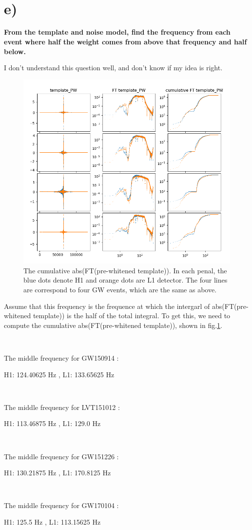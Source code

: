 \documentclass[showpacs, oneside, onecolumn, prl, amsmath, amssymb, nofootinbib, superscriptaddress, notitlepage]{revtex4-1}
\newcommand\bfig{\begin{figure}}
\newcommand\efig{\end{figure}}
\begin{document}
~~~~

~~~~

\section{e)}

\textbf{From the template and noise model, find the frequency from each event where half the weight comes from above that frequency and half below.}

I don't understand this question well, and don't know if my idea is right.

\bfig
	\centering
	\includegraphics[scale=0.8]{5-5-1.png}
	\caption{The cumulative abs(FT(pre-whitened template)). In each penal, the blue dots denote H1 and orange dots are L1 detector. The four lines are correspond to four GW events, which are the same as above.}
	\label{5-5-1}
\efig


Assume that this frequency is the frequence at which the intergarl of abs(FT(pre-whitened template)) is the half of the total integral. To get this, we need to compute the cumulative abs(FT(pre-whitened template)), shown in fig.\ref{5-5-1}.

{\color{gray}
~~~~

The middle frequency for GW150914 :

H1: 124.40625 Hz , L1: 133.65625 Hz

~~~~

The middle frequency for LVT151012 :

H1: 113.46875 Hz , L1: 129.0 Hz

~~~~

The middle frequency for GW151226 :

H1: 130.21875 Hz , L1: 170.8125 Hz

~~~~

The middle frequency for GW170104 :

H1: 125.5 Hz , L1: 113.15625 Hz

~~~~
}
\end{document}
